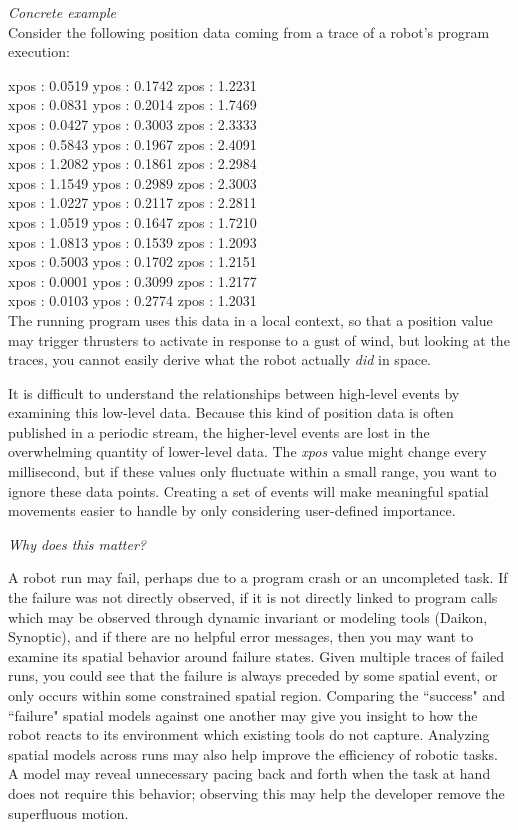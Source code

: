 \emph{Concrete example} \\
Consider the following position data coming from a trace of a robot's program execution:


xpos : 0.0519  ypos : 0.1742  zpos : 1.2231 \\
xpos : 0.0831  ypos : 0.2014  zpos : 1.7469 \\
xpos : 0.0427  ypos : 0.3003  zpos : 2.3333 \\
xpos : 0.5843  ypos : 0.1967  zpos : 2.4091 \\
xpos : 1.2082  ypos : 0.1861  zpos : 2.2984 \\
xpos : 1.1549  ypos : 0.2989  zpos : 2.3003 \\
xpos : 1.0227  ypos : 0.2117  zpos : 2.2811 \\
xpos : 1.0519  ypos : 0.1647  zpos : 1.7210 \\
xpos : 1.0813  ypos : 0.1539  zpos : 1.2093 \\
xpos : 0.5003  ypos : 0.1702  zpos : 1.2151 \\
xpos : 0.0001  ypos : 0.3099  zpos : 1.2177 \\
xpos : 0.0103  ypos : 0.2774  zpos : 1.2031 \\

The running program uses this data in a local context, so that a position value may trigger thrusters to activate in response to a gust of wind, but looking at the traces, you cannot easily derive what the robot actually \emph{did} in space.

It is difficult to understand the relationships between high-level events by examining this low-level data.  
Because this kind of position data is often published in a periodic stream, the higher-level events are lost in the overwhelming quantity of lower-level data.
The \emph{xpos} value might change every millisecond, but if these values only fluctuate within a small range, you want to ignore these data points.  
Creating a set of events will make meaningful spatial movements easier to handle by only considering user-defined importance.  

\emph{Why does this matter?}  

A robot run may fail, perhaps due to a program crash or an uncompleted task.  
If the failure was not directly observed, if it is not directly linked to program calls which may be observed through dynamic invariant or modeling tools (Daikon, Synoptic), and if there are no helpful error messages, then you may want to examine its spatial behavior around failure states.
Given multiple traces of failed runs, you could see that the failure is always preceded by some spatial event, or only occurs within some constrained spatial region.
Comparing the ``success" and ``failure" spatial models against one another may give you insight to how the robot reacts to its environment which existing tools do not capture.
Analyzing spatial models across runs may also help improve the efficiency of robotic tasks.  
A model may reveal unnecessary pacing back and forth when the task at hand does not require this behavior; observing this may help the developer remove the superfluous motion.

